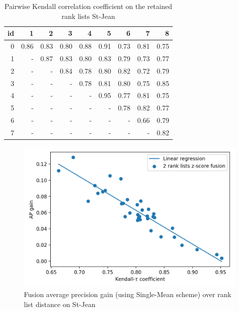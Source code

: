 \begin{table}
  \centering
  \caption{Pairwise Kendall correlation coefficient on the retained rank lists St-Jean}
  \label{tab:rl_correlations}
  \begin{tabular}{r|r r r r r r r r}
    \toprule
    id &    1 &    2 &    3 &    4 &    5 &    6 &    7 &    8 \\
    \midrule
    0  & 0.86 & 0.83 & 0.80 & 0.88 & 0.91 & 0.73 & 0.81 & 0.75 \\
    1  &    - & 0.87 & 0.83 & 0.80 & 0.83 & 0.79 & 0.73 & 0.77 \\
    2  &    - &    - & 0.84 & 0.78 & 0.80 & 0.82 & 0.72 & 0.79 \\
    3  &    - &    - &    - & 0.78 & 0.81 & 0.80 & 0.75 & 0.85 \\
    4  &    - &    - &    - &    - & 0.95 & 0.77 & 0.81 & 0.75 \\
    5  &    - &    - &    - &    - &    - & 0.78 & 0.82 & 0.77 \\
    6  &    - &    - &    - &    - &    - &    - & 0.66 & 0.79 \\
    7  &    - &    - &    - &    - &    - &    - &    - & 0.82 \\
    \bottomrule
  \end{tabular}
\end{table}

\begin{figure}
  \centering
  \caption{Fusion average precision gain (using Single-Mean scheme) over rank list distance on St-Jean}
  \label{fig:rl_correlations}
  \includegraphics[width=\linewidth]{img/rank_list_correlation_mean_st_jean.png}
\end{figure}

